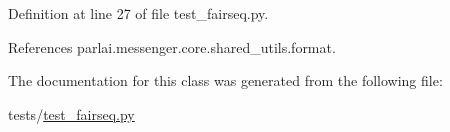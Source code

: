 Definition at line 27 of file test\+\_\+fairseq.\+py.



References parlai.\+messenger.\+core.\+shared\+\_\+utils.\+format.



The documentation for this class was generated from the following file\+:\begin{DoxyCompactItemize}
\item 
tests/\hyperlink{test__fairseq_8py}{test\+\_\+fairseq.\+py}\end{DoxyCompactItemize}
